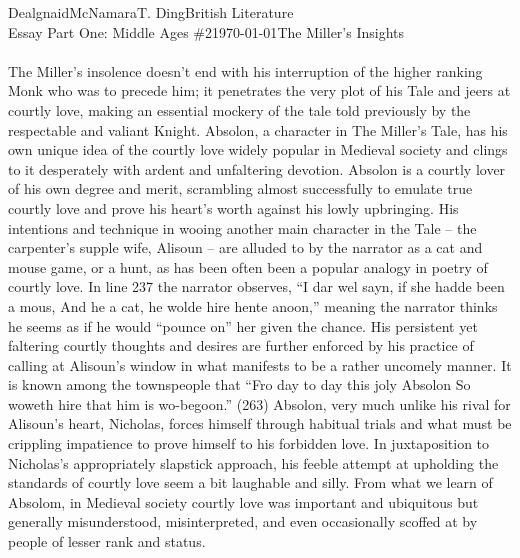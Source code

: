 \documentclass[12pt,letterpaper]{article}
\begin{document}
\begin{mla}{Dealgnaid}{McNamara}{T. Ding}{British Literature \\ Essay Part One: Middle Ages \#2}{\today}{The Miller's Insights}
\paragraph{}
	The Miller's insolence doesn't end with his interruption of the higher ranking Monk who was to precede him; it penetrates the very plot of his Tale and jeers at courtly love, making an essential mockery of the tale told previously by the respectable and valiant Knight. Absolon, a character in The Miller's Tale, has his own unique idea of the courtly love widely popular in Medieval society and clings to it desperately with ardent and unfaltering devotion. Absolon is a courtly lover of his own degree and merit, scrambling almost successfully to emulate true courtly love and prove his heart's worth against his lowly upbringing. His intentions and technique in wooing another main character in the Tale – the carpenter's supple wife, Alisoun – are alluded to by the narrator as a cat and mouse game, or a hunt, as has been often been a popular analogy in poetry of courtly love. In line 237 the narrator observes, “I dar wel sayn, if she hadde been a mous, And he a cat, he wolde hire hente anoon,” meaning the narrator thinks he seems as if he would “pounce on” her given the chance. His persistent yet faltering courtly thoughts and desires are further enforced by his practice of calling at Alisoun's window in what manifests to be a rather uncomely manner. It is known among the townspeople that “Fro day to day this joly Absolon So woweth hire that him is wo-begoon.” (263) Absolon, very much unlike his rival for Alisoun's heart, Nicholas, forces himself through habitual trials and what must be crippling impatience to prove himself to his forbidden love. In juxtaposition to Nicholas's appropriately slapstick approach, his feeble attempt at upholding the standards of courtly love seem a bit laughable and silly. From what we learn of Absolom, in Medieval society courtly love was important and ubiquitous but generally misunderstood, misinterpreted, and even occasionally scoffed at by people of lesser rank and status.

\end{mla}
\end{document}
